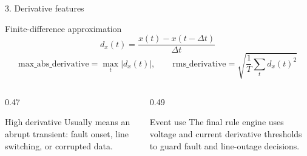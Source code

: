 \documentclass[aspectratio=169,10pt,t]{beamer}
\begin{document}
\fi
 %

\iffalse
\begin{frame}{3. Derivative features}
\small
\begin{block}{Finite-difference approximation}
\[
d_x(t) = \frac{x(t)-x(t-\Delta t)}{\Delta t}
\]
\[
\mathrm{max\_abs\_derivative}=\max_t |d_x(t)|,\qquad
\mathrm{rms\_derivative}=\sqrt{\frac{1}{T}\sum_t d_x(t)^2}
\]
\end{block}
\begin{columns}[T,totalwidth=\textwidth]
\begin{column}{0.47\textwidth}
\begin{exampleblock}{High derivative}
Usually means an abrupt transient: fault onset, line switching, or corrupted data.
\end{exampleblock}
\end{column}
\begin{column}{0.49\textwidth}
\begin{alertblock}{Event use}
The final rule engine uses voltage and current derivative thresholds to guard fault and line-outage decisions.
\end{alertblock}
\end{column}
\end{columns}
\end{frame}
\end{document}
